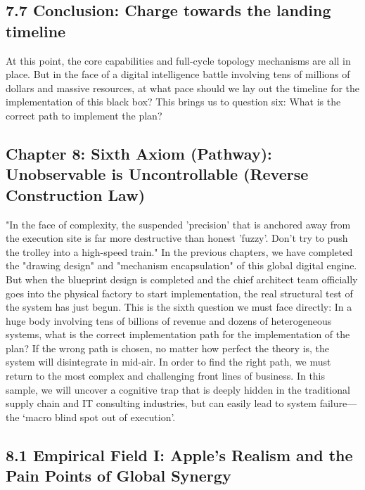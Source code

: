 \documentclass[11pt,a4paper]{article}
\begin{document}
\subsection*{7.7 Conclusion: Charge towards the landing timeline}


At this point, the core capabilities and full-cycle topology mechanisms are all in place. But in the face of a digital intelligence battle involving tens of millions of dollars and massive resources, at what pace should we lay out the timeline for the implementation of this black box? This brings us to question six: What is the correct path to implement the plan?

\subsection*{Chapter 8: Sixth Axiom (Pathway): Unobservable is Uncontrollable (Reverse Construction Law)}
"In the face of complexity, the suspended 'precision' that is anchored away from the execution site is far more destructive than honest 'fuzzy'. Don't try to push the trolley into a high-speed train." In the previous chapters, we have completed the "drawing design" and "mechanism encapsulation" of this global digital engine. But when the blueprint design is completed and the chief architect team officially goes into the physical factory to start implementation, the real structural test of the system has just begun. This is the sixth question we must face directly: In a huge body involving tens of billions of revenue and dozens of heterogeneous systems, what is the correct implementation path for the implementation of the plan? If the wrong path is chosen, no matter how perfect the theory is, the system will disintegrate in mid-air. In order to find the right path, we must return to the most complex and challenging front lines of business. In this sample, we will uncover a cognitive trap that is deeply hidden in the traditional supply chain and IT consulting industries, but can easily lead to system failure—the ‘macro blind spot out of execution’.


\subsection*{8.1 Empirical Field I: Apple’s Realism and the Pain Points of Global Synergy}
\end{document}
